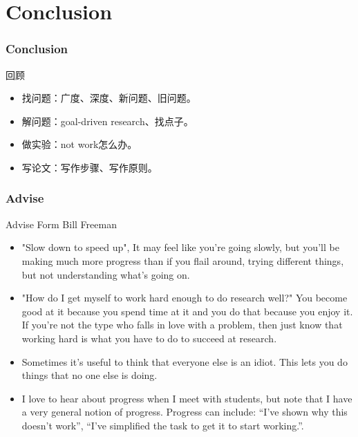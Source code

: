 \documentclass{beamer}
\begin{document}
\section{Conclusion}

\begin{frame}
    \frametitle{Conclusion}
    \begin{exampleblock}{回顾}
        \begin{itemize}
            \item 找问题：广度、深度、新问题、旧问题。
            \item 解问题：goal-driven research、找点子。
            \item 做实验：not work怎么办。
            \item 写论文：写作步骤、写作原则。
        \end{itemize}
    \end{exampleblock}
\end{frame}

\begin{frame}
    \frametitle{Advise}
    \begin{block}{Advise Form Bill Freeman}
        \begin{itemize}
            \item "Slow down to speed up", It may feel like you’re going slowly, but you’ll be making much more progress than if you flail around, trying different things, but not understanding what’s going on.
            \item "How do I get myself to work hard enough to do research well?" You become good at it because you spend time at it and you do that because you enjoy it.  If you’re not the type who falls in love with a problem, then just know that working hard is what you have to do to succeed at research.
            \item Sometimes it’s useful to think that everyone else is an idiot. This lets you do things that no one else is
            doing.
            \item I love to hear about progress when I meet with students, but note that I have a very general notion of
            progress. Progress can include: “I’ve shown why this doesn’t work”, “I’ve simplified the task to get it to
            start working.”.
        \end{itemize}
    \end{block}
\end{frame}
\end{document}
